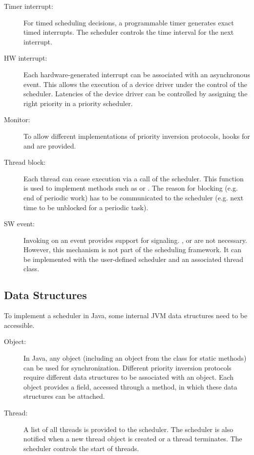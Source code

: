 \begin{description}

\item[Timer interrupt:] For timed scheduling decisions, a programmable
timer generates exact timed interrupts. The scheduler controls the
time interval for the next interrupt.

\item[HW interrupt:] Each hardware-generated interrupt can be associated
with an asynchronous event. This allows the execution of a device
driver under the control of the scheduler. Latencies of the device
driver can be controlled by assigning the right priority in a
priority scheduler.

\item[Monitor:] To allow different implementations of priority inversion
protocols, hooks for  and  are
provided.

\item[Thread block:] Each thread can cease execution via a call of the
scheduler. This function is used to implement methods such as
 or . The reason for
blocking (e.g. end of periodic work) has to be communicated to the
scheduler (e.g. next time to be unblocked for a periodic task).

\item[SW event:] Invoking  on an event provides support for
signaling. ,  or  are
not necessary. However, this mechanism is not part of the scheduling
framework. It can be implemented with the user-defined scheduler and
an associated thread class.

\end{description}

\subsection{Data Structures}

To implement a scheduler in Java, some internal JVM data structures
need to be accessible.

\begin{description}

\item[Object:] In Java, any object (including an object from the class
 for static methods) can be used for synchronization.
Different priority inversion protocols require different data
structures to be associated with an object. Each object provides a
field, accessed through a  method, in which these
data structures can be attached.

\item[Thread:] A list of all threads is provided to the scheduler. The
scheduler is also notified when a new thread object is created or a
thread terminates. The scheduler controls the start of threads.

\end{description}

